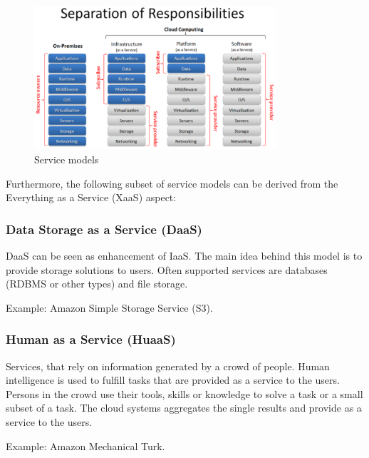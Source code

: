\begin{figure}[h]
	\centering
		\includegraphics[width=0.8\textwidth]{graphics/service_models.eps}
	\caption{Service models\cite{trustedcloudcomputing}}
	\label{fig:cloud_stack}
\end{figure}



Furthermore, the following subset of service models can be derived from the Everything as a Service (XaaS) aspect:

\subsubsection{Data Storage as a Service (DaaS)}
DaaS can be seen as enhancement of IaaS. The main idea behind this model is to provide storage solutions to users. Often supported services are databases (RDBMS or other types) and file storage.
		
Example: Amazon Simple Storage Service (S3)\cite{issues}.

\subsubsection{Human as a Service (HuaaS)}
Services, that rely on information generated by a crowd of people. Human intelligence is used to fulfill tasks that are provided as a service to the users. Persons in the crowd use their tools, skills or knowledge to solve a task or a small subset of a task. The cloud systems aggregates the single results and provide as a service to the users.
	
Example: Amazon Mechanical Turk\cite{huaas}.

